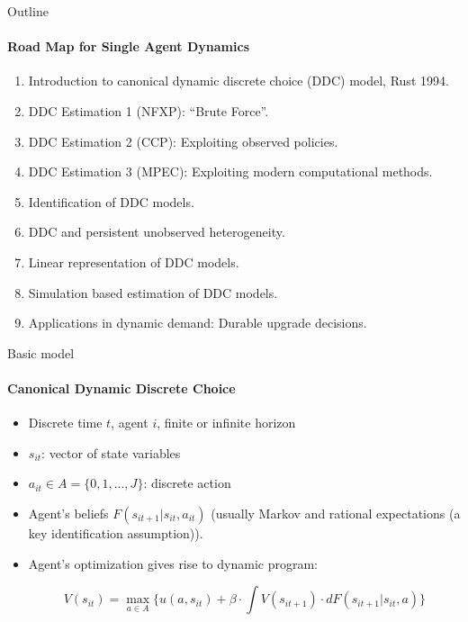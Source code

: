 \documentclass[11pt,aspectratio=169]{beamer}
\begin{document}
\begin{frame}{Outline}
\framesubtitle{Road Map for Single Agent Dynamics} 
\vspace{-0.3cm}
\begin{enumerate}\footnotesize
	\item Introduction to canonical dynamic discrete choice (DDC) model, Rust 1994.
	\item DDC Estimation 1 (NFXP): ``Brute Force''. %
	\item DDC Estimation 2 (CCP): Exploiting observed policies. %
	\item DDC Estimation 3 (MPEC): Exploiting modern computational methods. 
	\item Identification of DDC models.
	\item DDC and persistent unobserved heterogeneity.
	\item Linear representation of DDC models.		
	\item Simulation based estimation of DDC models.
	\item Applications in dynamic demand: Durable upgrade decisions.		
\end{enumerate}
\end{frame}

\begin{frame}{Basic model}
\framesubtitle{Canonical Dynamic Discrete Choice}

\small

\begin{itemize}
\item Discrete time $t$, agent $i$, finite or infinite horizon
\item $s_{it}$: vector of state variables
\item $a_{it} \in A = \{0,1,...,J\}$: discrete action
\item Agent's beliefs $F(s_{it+1} \vert s_{it},a_{it})$ (usually Markov and rational expectations (a key identification assumption)).
\item Agent's optimization gives rise to dynamic program:

\begin{equation*}
V(s_{it}) = \max_{a\in A} \{ u(a,s_{it}) + \beta\cdot \int V(s_{it+1})\cdot dF(s_{it+1} \vert s_{it},a) \} 
\end{equation*}



\end{itemize}
\end{frame}
\end{document}
